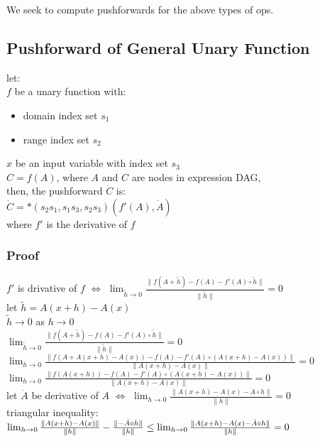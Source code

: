 \documentclass[8pt]{extarticle}
\begin{document}
\begin{multicols*}{2}
  We seek to compute pushforwards for the above types of ops.

  \vfill\null
  \columnbreak
    
  \subsection{Pushforward of General Unary Function}
  let:\\
  $f$ be a unary function with:
  \begin{itemize}
  \item domain index set $s_1$
  \item range index set $s_2$
  \end{itemize}
  $x$ be an input variable with index set $s_3$\\
  $C=f(A)$, where $A$  and $C$ are nodes in expression DAG,\\
  then, the pushforward $\dot{C}$ is:\\
  $\dot{C} = *(s_2 s_1, s_1 s_3, s_2 s_3)( f'(A), \dot{A})$\\
  where $f'$ is the derivative of $f$

  \subsubsection{Proof}
  $f'$ is drivative of $f$ $\iff$ $\lim_{\tilde{h} \rightarrow 0} \frac{\| f(A+\tilde{h}) - f(A) - f'(A) \circ \tilde{h} \|}{\| \tilde{h} \|} = 0$\\

  let $\tilde{h} = A(x+h) - A(x)$\\
  $\tilde{h} \rightarrow 0$ as $h \rightarrow 0$\\

  $\lim_{\tilde{h} \rightarrow 0} \frac{\| f(A+\tilde{h}) - f(A) - f'(A) \circ \tilde{h} \|}{\| \tilde{h} \|} = 0$\\
  $\lim_{h \rightarrow 0} \frac{\| f(A + A(x+h) - A(x)) - f(A) - f'(A) \circ (A(x+h) - A(x)) \|}{\| A(x+h) - A(x) \|} = 0$\\
  $\lim_{h \rightarrow 0} \frac{\| f(A(x+h)) - f(A) - f'(A) \circ (A(x+h) - A(x)) \|}{\| A(x+h) - A(x) \|} = 0$\\

  let $\dot{A}$ be derivative of $A$ $\iff$ $\lim_{h\rightarrow 0} \frac{\| A(x+h) - A(x) - \dot{A} \circ h\|}{\| h \|} = 0$\\
  triangular inequality:\\
  $\lim_{h\rightarrow 0} \frac{\| A(x+h) - A(x) \|}{\| h \|} - \frac{\| - \dot{A} \circ h\|}{\| h \|} \\
  \leq \lim_{h\rightarrow 0} \frac{\| A(x+h) - A(x) - \dot{A} \circ h\|}{\| h \|} = 0$\\


\end{multicols*}
\end{document}
